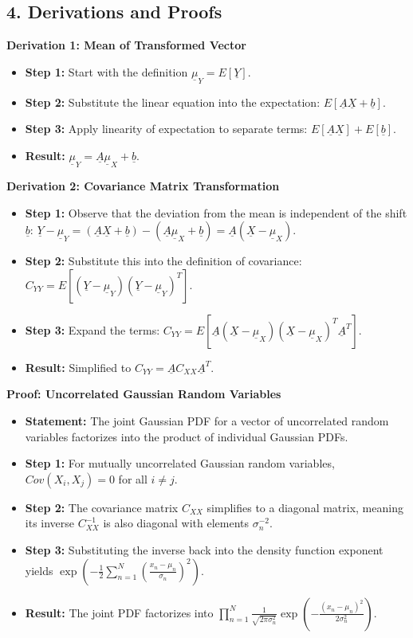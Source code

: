 \documentclass[12pt]{article}
\begin{document}
\subsection*{4. Derivations and Proofs}

\textbf{Derivation 1: Mean of Transformed Vector}
\begin{itemize}
    \item \textbf{Step 1:} Start with the definition $\underline{\mu}_Y = E[\underline{Y}]$.
    \item \textbf{Step 2:} Substitute the linear equation into the expectation: $E[\underline{A}\underline{X} + \underline{b}]$.
    \item \textbf{Step 3:} Apply linearity of expectation to separate terms: $E[\underline{A}\underline{X}] + E[\underline{b}]$.
    \item \textbf{Result:} $\underline{\mu}_Y = \underline{A}\underline{\mu}_X + \underline{b}$.
\end{itemize}

\textbf{Derivation 2: Covariance Matrix Transformation}
\begin{itemize}
    \item \textbf{Step 1:} Observe that the deviation from the mean is independent of the shift $\underline{b}$: $\underline{Y} - \underline{\mu}_Y = (\underline{A}\underline{X} + \underline{b}) - (\underline{A}\underline{\mu}_X + \underline{b}) = \underline{A}(\underline{X} - \underline{\mu}_X)$.
    \item \textbf{Step 2:} Substitute this into the definition of covariance: $C_{YY} = E[(\underline{Y} - \underline{\mu}_Y)(\underline{Y} - \underline{\mu}_Y)^T]$.
    \item \textbf{Step 3:} Expand the terms: $C_{YY} = E[\underline{A}(\underline{X} - \underline{\mu}_X)(\underline{X} - \underline{\mu}_X)^T\underline{A}^T]$.
    \item \textbf{Result:} Simplified to $C_{YY} = \underline{A}C_{XX}\underline{A}^T$.
\end{itemize}

\textbf{Proof: Uncorrelated Gaussian Random Variables}
\begin{itemize}
    \item \textbf{Statement:} The joint Gaussian PDF for a vector of uncorrelated random variables factorizes into the product of individual Gaussian PDFs.
    \item \textbf{Step 1:} For mutually uncorrelated Gaussian random variables, $Cov(X_i, X_j) = 0$ for all $i \neq j$.
    \item \textbf{Step 2:} The covariance matrix $C_{XX}$ simplifies to a diagonal matrix, meaning its inverse $C_{XX}^{-1}$ is also diagonal with elements $\sigma_n^{-2}$.
    \item \textbf{Step 3:} Substituting the inverse back into the density function exponent yields $\exp\left(-\frac{1}{2} \sum_{n=1}^N \left(\frac{x_n - \mu_n}{\sigma_n}\right)^2\right)$.
    \item \textbf{Result:} The joint PDF factorizes into $\prod_{n=1}^N \frac{1}{\sqrt{2\pi\sigma_n^2}} \exp\left(-\frac{(x_n - \mu_n)^2}{2\sigma_n^2}\right)$.
\end{itemize}
\end{document}
